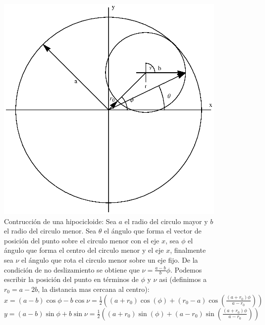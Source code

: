 \documentclass[letterpaper,10pt]{article}
\begin{document}
\begin{figure}
\centering
\includegraphics[width=0.9 \textwidth]{dib.eps}
\caption{Contrucci\'on de una hipocicloide: Sea $a$ el radio del circulo mayor y $b$ el radio del circulo menor. Sea $\theta$ el \'angulo que forma el vector de posici\'on del punto sobre el circulo menor con el eje $x$, sea $\phi$ el \'angulo que forma el centro del circulo menor y el eje $x$, finalmente sea $\nu$ el \'angulo que rota el circulo menor sobre un eje fijo. De la condici\'on de no deslizamiento se obtiene que $\nu=\frac{a-b}{b} \phi$. Podemos escribir la posici\'on del punto en t\'erminos de $\phi$ y $\nu$ asi (definimos a $r_0=a-2b$, la distancia mas cercana al centro):
$x=(a-b)\cos \phi-b \cos \nu=\frac{1}{2}\left((a+r_0) \cos (\phi)+(r_0-a) \cos \left(\frac{(a+r_0) \phi}{a-r_0}\right)\right)$
$y=(a-b)\sin \phi+b \sin \nu=\frac{1}{2}\left((a+r_0) \sin (\phi)+(a-r_0) \sin \left(\frac{(a+r_0) \phi}{a-r_0} \right)\right)$}
\label{a}
\end{figure}
\end{document}
